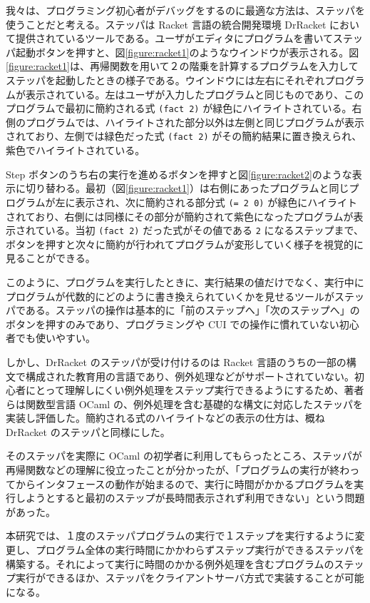 我々は、プログラミング初心者がデバッグをするのに最適な方法は、ステッパを使うことだと考える。ステッパは Racket 言語の統合開発環境 DrRacket において提供されているツール\cite{clements01}である。ユーザがエディタにプログラムを書いてステッパ起動ボタンを押すと、図\ref{figure:racket1}のようなウインドウが表示される。図\ref{figure:racket1}は、再帰関数を用いて２の階乗を計算するプログラムを入力してステッパを起動したときの様子である。ウインドウには左右にそれぞれプログラムが表示されている。左はユーザが入力したプログラムと同じものであり、このプログラムで最初に簡約される式 \texttt{(fact 2)} が緑色にハイライトされている。右側のプログラムでは、ハイライトされた部分以外は左側と同じプログラムが表示されており、左側では緑色だった式 \texttt{(fact 2)} がその簡約結果に置き換えられ、紫色でハイライトされている。

Step ボタンのうち右の実行を進めるボタンを押すと図\ref{figure:racket2}のような表示に切り替わる。最初（図\ref{figure:racket1}）は右側にあったプログラムと同じプログラムが左に表示され、次に簡約される部分式 \texttt{(= 2 0)} が緑色にハイライトされており、右側には同様にその部分が簡約されて紫色になったプログラムが表示されている。当初 \texttt{(fact 2)} だった式がその値である \texttt{2} になるステップまで、ボタンを押すと次々に簡約が行われてプログラムが変形していく様子を視覚的に見ることができる。

このように、プログラムを実行したときに、実行結果の値だけでなく、実行中にプログラムが代数的にどのように書き換えられていくかを見せるツールがステッパである。ステッパの操作は基本的に「前のステップへ」「次のステップへ」のボタンを押すのみであり、プログラミングや CUI での操作に慣れていない初心者でも使いやすい。

しかし、DrRacket のステッパが受け付けるのは Racket 言語のうちの一部の構文で構成された教育用の言語であり、例外処理などがサポートされていない。初心者にとって理解しにくい例外処理をステップ実行できるようにするため、著者らは関数型言語 OCaml の、例外処理を含む基礎的な構文に対応したステッパを実装し評価した\cite{FCA18}。簡約される式のハイライトなどの表示の仕方は、概ね DrRacket のステッパ\cite{clements01}と同様にした。

そのステッパを実際に OCaml の初学者に利用してもらった\cite{FCA18}ところ、ステッパが再帰関数などの理解に役立ったことが分かったが、「プログラムの実行が終わってからインタフェースの動作が始まるので、実行に時間がかかるプログラムを実行しようとすると最初のステップが長時間表示されず利用できない」という問題があった。

本研究では、１度のステッパプログラムの実行で１ステップを実行するように変更し、プログラム全体の実行時間にかかわらずステップ実行ができるステッパを構築する。それによって実行に時間のかかる例外処理を含むプログラムのステップ実行ができるほか、ステッパをクライアントサーバ方式で実装することが可能になる。
